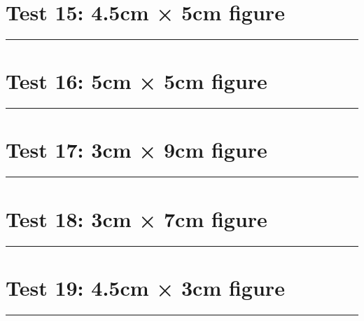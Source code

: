 \documentclass[a4paper,11pt]{article}
\begin{document}
\section*{Test 15: 4.5cm × 5cm figure}
\begin{swarmwrap}%
  \begin{minipage}[t]{4cm}
    \centering
    \rule{\linewidth}{5cm}
  \end{minipage}%
\end{swarmwrap}%
\swarmwrapnext
\lipsum[22]
\lipsum[23]
\lipsum[24]
\lipsum[25]
\lipsum[26]
\section*{Test 16: 5cm × 5cm figure}
\begin{swarmwrap}%
  \begin{minipage}[t]{5cm}
    \centering
    \rule{\linewidth}{5cm}
  \end{minipage}%
\end{swarmwrap}%
\swarmwrapnext
\lipsum[99]
\lipsum[100]
\lipsum[101]
\section*{Test 17: 3cm × 9cm figure}
\begin{swarmwrap}%
  \begin{minipage}[t]{3cm}
    \centering
    \rule{\linewidth}{9cm}
  \end{minipage}%
\end{swarmwrap}%
\swarmwrapnext
\lipsum[43]
\lipsum[44]
\lipsum[45]
\lipsum[46]
\lipsum[47]
\section*{Test 18: 3cm × 7cm figure}
\begin{swarmwrap}%
  \begin{minipage}[t]{3cm}
    \centering
    \rule{\linewidth}{7cm}
  \end{minipage}%
\end{swarmwrap}%
\swarmwrapnext
\lipsum[70]
\lipsum[71]
\lipsum[72]
\lipsum[73]
\section*{Test 19: 4.5cm × 3cm figure}
\begin{swarmwrap}%
  \begin{minipage}[t]{4cm}
    \centering
    \rule{\linewidth}{3cm}
  \end{minipage}%
\end{swarmwrap}%
\swarmwrapnext
\lipsum[138]
\lipsum[139]
\lipsum[140]
\lipsum[141]
\end{document}
